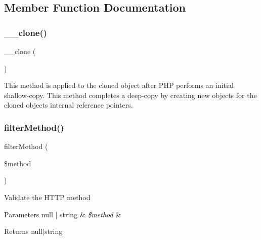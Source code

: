 \subsection{Member Function Documentation}
\mbox{\label{class_pes_1_1_http_1_1_request_ad0cb87b388bc74d63dc884accdca8713}} 
\subsubsection{\texorpdfstring{\+\_\+\+\_\+clone()}{\_\_clone()}}
{\footnotesize\ttfamily \+\_\+\+\_\+clone (\begin{DoxyParamCaption}{ }\end{DoxyParamCaption})}

This method is applied to the cloned object after P\+HP performs an initial shallow-\/copy. This method completes a deep-\/copy by creating new objects for the cloned object\textquotesingle{}s internal reference pointers. \mbox{\label{class_pes_1_1_http_1_1_request_a53898ae51d98cbd7a413a0f2d348781e}} 
\subsubsection{\texorpdfstring{filter\+Method()}{filterMethod()}}
{\footnotesize\ttfamily filter\+Method (\begin{DoxyParamCaption}\item[{}]{\$method }\end{DoxyParamCaption})\hspace{0.3cm}{\ttfamily [protected]}}

Validate the H\+T\+TP method


\begin{DoxyParams}[1]{Parameters}
null | string & {\em \$method} & \\
\hline
\end{DoxyParams}
\begin{DoxyReturn}{Returns}
null$\vert$string 
\end{DoxyReturn}

